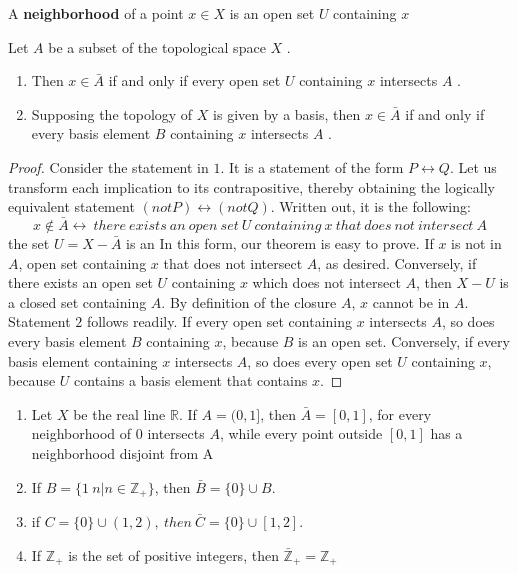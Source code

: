 \documentclass[a4paper,english,12pt]{article}
\begin{document}
\begin{defn}
A \textbf{neighborhood} of a point $x \in X$ is an open set $U$ containing $x$
\end{defn}
\begin{thm}
Let $A$ be a subset of the topological space $X$ .
\begin{enumerate}
\item  Then $x \in \bar{A}$ if and only if every open set $U$ containing $x$ intersects $A$ .
\item Supposing the topology of $X$ is given by a basis, then $x \in \bar{A}$ if and only if every basis element $B$ containing $x$ intersects $A$ .
\end{enumerate}
\begin{proof}
Consider the statement in $1$. It is a statement of the form $P \leftrightarrow Q$. Let
us transform each implication to its contrapositive, thereby obtaining the logically
equivalent statement $(not P) \leftrightarrow (not Q)$. Written out, it is the following:
\[x \notin \bar{A} \longleftrightarrow \ there \ exists \ an \ open \ set \ U \ containing \ x \ that \ does \ not \ intersect \ A \]
the set $U = X - \bar{A}$ is an In this form, our theorem is easy to prove. If $x$ is not in $A$, open set containing $x$ that does not intersect $A$, as desired. Conversely, if there exists an open set $U$ containing $x$ which does not intersect $A$, then $X - U$ is a closed set containing $A$. By definition of the closure $A$, $x$ cannot be in $A$. Statement $2$ follows readily. If every open set containing $x$ intersects $A$, so does every basis element $B$ containing $x$, because $B$ is an open set. Conversely, if every basis element containing $x$ intersects $A$, so does every open set $U$ containing $x$, because $U$ contains a basis element that contains $x$.
\end{proof}
\end{thm}
\begin{exmp}
\begin{enumerate}
\item Let $X$ be the real line $\mathbb{R}$. If $A = (0, 1]$, then $\bar{A} = [0, 1]$, for every neighborhood of $0$ intersects $A$, while every point outside $[0, 1]$ has a neighborhood disjoint from A
\item If $B = \{1 \ n | n \in  \mathbb{Z}_+ \}$, then $\bar{B}= \{0\} \cup B$.
\item if $C = \{0\} \cup  (1, 2), \ then \  \bar{C}= \{0\} \cup [1, 2]$.
\item If $\mathbb{Z}_+ $ is the set of positive integers, then $\mathbb{\bar{Z}}_+ = \mathbb{Z}_+$
\end{enumerate}
\end{exmp}
\end{document}
